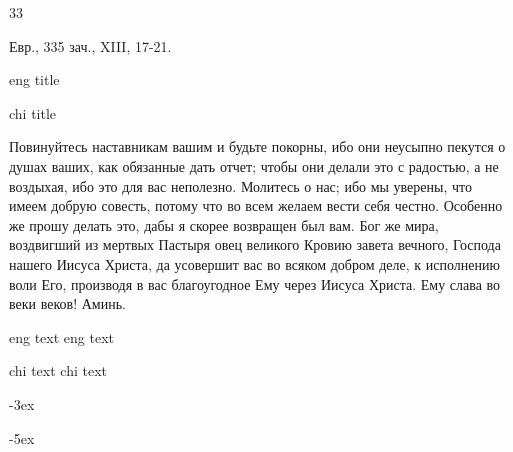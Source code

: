 33

\onehalfspacing %

\doublespacing %

\Large%

Евр., 335 зач., XIII, 17-21.

eng title

chi title

Повинуйтесь наставникам вашим и будьте покорны, ибо они неусыпно пекутся о душах ваших, как обязанные дать отчет; чтобы они делали это с радостью, а не воздыхая, ибо это для вас неполезно.
Молитесь о нас; ибо мы уверены, что имеем добрую совесть, потому что во всем желаем вести себя честно.
Особенно же прошу делать это, дабы я скорее возвращен был вам.
Бог же мира, воздвигший из мертвых Пастыря овец великого Кровию завета вечного, Господа нашего Иисуса Христа,
да усовершит вас во всяком добром деле, к исполнению воли Его, производя в вас благоугодное Ему через Иисуса Христа. Ему слава во веки веков! Аминь. 

eng text
eng text

chi text
chi text

\Huge%

-3ex%

-5ex%
